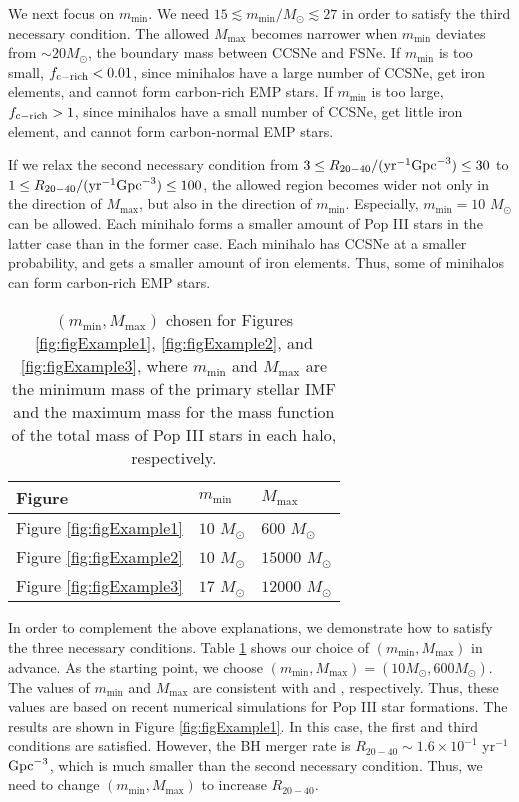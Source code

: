 \documentclass[pdftex]{pasj01}
\newcommand{\msun}{M_\odot}
\newcommand{\pyr}{{\rm yr}^{-1}}
\newcommand{\cgpc}{{\rm Gpc}^{-3}}
\newcommand{\mlmax}{M_{\max}}
\newcommand{\msmin}{m_{\min}}
\newcommand{\ratetarget}{R_{20-40}}
\newcommand{\fcemp}{f_{\rm c-rich}}
\begin{document}
We next focus on $\msmin$.  We need $15 \lesssim \msmin/\msun \lesssim
27$ in order to satisfy the third necessary condition. The allowed
$\mlmax$ becomes narrower when $\msmin$ deviates from $\sim 20 \msun$,
the boundary mass between CCSNe and FSNe. If $\msmin$ is too small,
$\fcemp < 0.01$, since minihalos have a large number of CCSNe, get
iron elements, and cannot form carbon-rich EMP stars.  If $\msmin$ is
too large, $\fcemp > 1$, since minihalos have a small number of CCSNe,
get little iron element, and cannot form carbon-normal EMP stars.

If we relax the second necessary condition from $3 \le
\ratetarget/(\pyr \cgpc) \le 30$ to $1 \le \ratetarget/(\pyr \cgpc)
\le 100$, the allowed region becomes wider not only in the direction
of $\mlmax$, but also in the direction of $\msmin$. Especially,
$\msmin = 10$ $\msun$ can be allowed. Each minihalo forms a smaller
amount of Pop III stars in the latter case than in the former
case. Each minihalo has CCSNe at a smaller probability, and gets a
smaller amount of iron elements. Thus, some of minihalos can form
carbon-rich EMP stars.

\begin{table}
    \caption{$(\msmin, \mlmax)$ chosen for Figures
      \ref{fig:figExample1}, \ref{fig:figExample2}, and
      \ref{fig:figExample3}, where $\msmin$ and $\mlmax$ are the
      minimum mass of the primary stellar IMF and the maximum mass for
      the mass function of the total mass of Pop III stars in each
      halo, respectively.}
    \label{tab:msmin_mlmax}
    \centering
    \begin{tabular}{lll}
    \hline
        Figure & $\msmin$ & $\mlmax$ \\
    \hline
        Figure \ref{fig:figExample1} & $10$ $\msun$ & $600$   $\msun$ \\
        Figure \ref{fig:figExample2} & $10$ $\msun$ & $15000$ $\msun$ \\
        Figure \ref{fig:figExample3} & $17$ $\msun$ & $12000$ $\msun$ \\
    \hline
    \end{tabular}
\end{table}

In order to complement the above explanations, we demonstrate how to
satisfy the three necessary conditions. Table \ref{tab:msmin_mlmax}
shows our choice of $(\msmin, \mlmax)$ in advance. As the starting
point, we choose $(\msmin, \mlmax) = (10\msun, 600\msun)$. The values
of $\msmin$ and $\mlmax$ are consistent with
\citet{2014ApJ...792...32S} and \citet{2020MNRAS.492.4386S},
respectively. Thus, these values are based on recent numerical
simulations for Pop III star formations. The results are shown in
Figure \ref{fig:figExample1}. In this case, the first and third
conditions are satisfied. However, the BH merger rate is $\ratetarget
\sim 1.6 \times 10^{-1}$ yr$^{-1}$ $\cgpc$, which is much smaller than
the second necessary condition. Thus, we need to change $(\msmin,
\mlmax)$ to increase $\ratetarget$.
\end{document}
